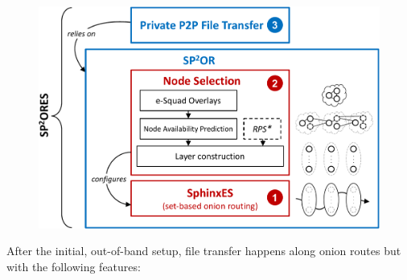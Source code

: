 \begin{figure}[t]
  \centering
  \def\svgwidth{0.8\columnwidth}
    \includegraphics[width=\columnwidth]{figures/OverviewSPORES_cropped}
  \caption{\label{fig:outline}%
    \protect{}}
\end{figure}

After the initial, out-of-band setup, file transfer happens along
onion routes but with the following features:

